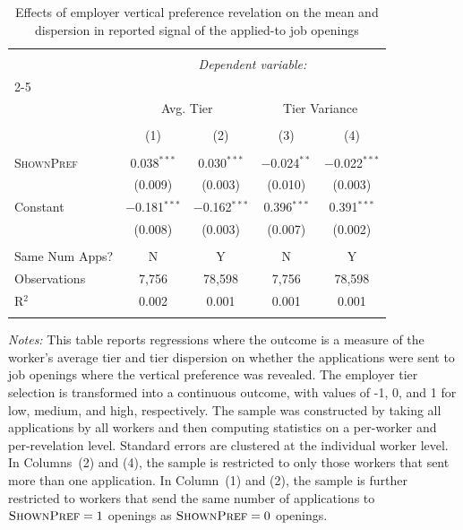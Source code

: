 
\begin{table}[!htbp] \centering 
  \caption{Effects of employer vertical preference revelation on the mean and dispersion in reported signal of the applied-to job openings} 
  \label{tab:worker_targeted_apps} 
\small 
\begin{tabular}{@{\extracolsep{5pt}}lcccc} 
\\[-1.8ex]\hline 
\hline \\[-1.8ex] 
 & \multicolumn{4}{c}{\textit{Dependent variable:}} \\ 
\cline{2-5} 
\\[-1.8ex] & \multicolumn{2}{c}{Avg. Tier} & \multicolumn{2}{c}{Tier Variance} \\ 
\\[-1.8ex] & (1) & (2) & (3) & (4)\\ 
\hline \\[-1.8ex] 
 \textsc{ShownPref} & 0.038$^{***}$ & 0.030$^{***}$ & $-$0.024$^{**}$ & $-$0.022$^{***}$ \\ 
  & (0.009) & (0.003) & (0.010) & (0.003) \\ 
  Constant & $-$0.181$^{***}$ & $-$0.162$^{***}$ & 0.396$^{***}$ & 0.391$^{***}$ \\ 
  & (0.008) & (0.003) & (0.007) & (0.002) \\ 
 \hline \\[-1.8ex] 
Same Num Apps? & N & Y & N & Y \\ 
Observations & 7,756 & 78,598 & 7,756 & 78,598 \\ 
R$^{2}$ & 0.002 & 0.001 & 0.001 & 0.001 \\ 
\hline 
\hline \\[-1.8ex] 
\end{tabular}
\begin{minipage}{1\textwidth} 
 \emph{Notes:} 
This table reports regressions where the outcome is a measure of the worker's average tier and tier dispersion on whether the applications were sent to job openings where the vertical preference was revealed.
The employer tier selection is transformed into a continuous outcome, with values of -1, 0, and 1 for low, medium, and high, respectively.
The sample was constructed by taking all applications by all workers and then computing statistics on a per-worker and per-revelation level.
Standard errors are clustered at the individual worker level. 
In Columns~(2) and (4), the sample is restricted to only those workers that sent more than one application.
In Column~(1) and (2), the sample is further restricted to workers that send the same number of applications to $\textsc{ShownPref}=1$ openings as $\textsc{ShownPref}=0$ openings.
 \starlanguage
 \end{minipage}
\end{table}
